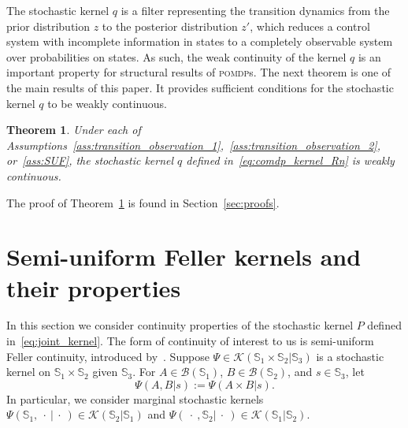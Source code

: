 \documentclass[11pt,onecolumn]{IEEEtran}  %
\newcommand{\Sb}{\mathbb{S}}
\newcommand{\Bc}{\mathcal{B}}
\newcommand{\Kc}{\mathcal{K}}
\newcommand{\defeq}{:=}%
\newcommand{\pomdp}{\textsc{pomdp}}
\newtheorem{theorem}{Theorem}
\theoremstyle{definition}
\begin{document}
The stochastic kernel $q$ is a filter representing the transition dynamics from the prior distribution $z$ to the posterior distribution $z'$, which reduces a control system with incomplete information in states to a completely observable system over probabilities on states. As such, the weak continuity of the kernel $q$ is an important property for structural results of \pomdp{}s. The next theorem is one of the main results of this paper. It provides sufficient conditions for the stochastic kernel $q$ to be weakly continuous.
\begin{theorem} \label{thm:main_result}
    Under each of Assumptions~\ref{ass:transition_observation_1},~\ref{ass:transition_observation_2}, or~\ref{ass:SUF}, the stochastic kernel $q$ defined in~\eqref{eq:comdp_kernel_Rn} is weakly continuous.
\end{theorem}

The proof of Theorem~\ref{thm:main_result} is found in Section~\ref{sec:proofs}.

\section{Semi-uniform Feller kernels and their properties} \label{sec:semi-uniform_Feller}

In this section we consider continuity properties of the stochastic kernel $P$ defined in~\eqref{eq:joint_kernel}. The form of continuity of interest to us is semi-uniform Feller continuity, introduced by~\citet{feinberg_markov_2022,JThProb}. Suppose $\Psi \in \Kc(\Sb_1 \times \Sb_2 | \Sb_3)$ is a stochastic kernel on $\Sb_1 \times \Sb_2$ given $\Sb_3$. For $A \in \Bc(\Sb_1)$, $B \in \Bc(\Sb_2)$, and $s \in \Sb_3$, let
\begin{equation}\label{eq:marg_new}
    \Psi(A,B|s) \defeq \Psi(A\times B|s).
\end{equation}
In particular, we consider marginal stochastic kernels
$\Psi(\Sb_1,\:\cdot\:|\:\cdot\:) \in \Kc(\Sb_2|\Sb_1)$ and $\Psi(\:\cdot\:,\Sb_2|\:\cdot\:) \in \Kc(\Sb_1|\Sb_2)$.
\end{document}

